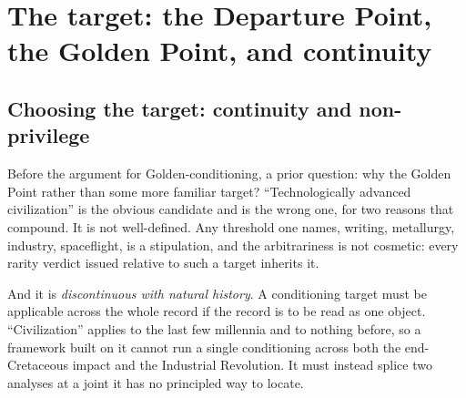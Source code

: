 \section{The target: the Departure Point, the Golden Point, and continuity}\label{sec:target}

\subsection{Choosing the target: continuity and non-privilege}\label{gc:sub:continuity}

Before the argument for Golden-conditioning, a prior question: why the
Golden Point rather than some more familiar target? ``Technologically
advanced civilization'' is the obvious candidate and is the wrong one,
for two reasons that compound. It is not well-defined. Any threshold one names, writing, metallurgy,
industry, spaceflight, is a stipulation, and the arbitrariness is not
cosmetic: every rarity verdict issued relative to such a target inherits
it.

And it is \emph{discontinuous with natural history}. A conditioning
target must be applicable across the whole record if the record is to be
read as one object. ``Civilization'' applies to the last few millennia
and to nothing before, so a framework built on it cannot run a single
conditioning across both the end-Cretaceous impact and the Industrial
Revolution. It must instead splice two analyses at a joint it has no
principled way to locate.

